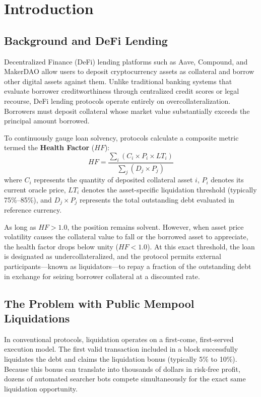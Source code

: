 \chapter{Introduction}
\label{chap:intro}

\section{Background and DeFi Lending}
Decentralized Finance (DeFi) lending platforms such as Aave, Compound, and MakerDAO allow users to deposit cryptocurrency assets as collateral and borrow other digital assets against them. Unlike traditional banking systems that evaluate borrower creditworthiness through centralized credit scores or legal recourse, DeFi lending protocols operate entirely on overcollateralization. Borrowers must deposit collateral whose market value substantially exceeds the principal amount borrowed.

To continuously gauge loan solvency, protocols calculate a composite metric termed the \textbf{Health Factor} ($HF$):
\begin{equation}
HF = \frac{\sum_{i} \left( C_i \times P_i \times LT_i \right)}{\sum_{j} \left( D_j \times P_j \right)}
\label{eq:health_factor}
\end{equation}
where $C_i$ represents the quantity of deposited collateral asset $i$, $P_i$ denotes its current oracle price, $LT_i$ denotes the asset-specific liquidation threshold (typically 75\%--85\%), and $D_j \times P_j$ represents the total outstanding debt evaluated in reference currency.

As long as $HF > 1.0$, the position remains solvent. However, when asset price volatility causes the collateral value to fall or the borrowed asset to appreciate, the health factor drops below unity ($HF < 1.0$). At this exact threshold, the loan is designated as undercollateralized, and the protocol permits external participants---known as liquidators---to repay a fraction of the outstanding debt in exchange for seizing borrower collateral at a discounted rate.

\section{The Problem with Public Mempool Liquidations}
In conventional protocols, liquidation operates on a first-come, first-served execution model. The first valid transaction included in a block successfully liquidates the debt and claims the liquidation bonus (typically 5\% to 10\%). Because this bonus can translate into thousands of dollars in risk-free profit, dozens of automated searcher bots compete simultaneously for the exact same liquidation opportunity.

